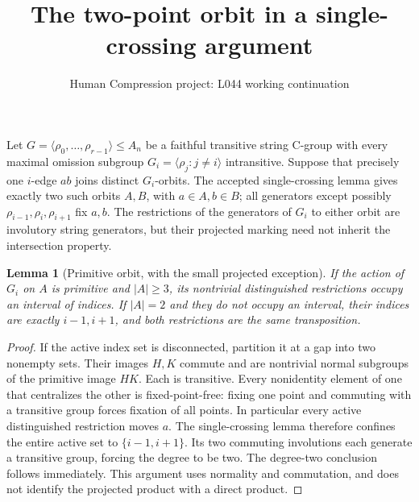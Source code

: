 \documentclass[11pt,a4paper]{article}
\title{The two-point orbit in a single-crossing argument}
\author{Human Compression project: L044 working continuation}
\date{}
\newtheorem{lemma}{Lemma}
\newcommand{\gen}[1]{\langle#1\rangle}
\begin{document}
\maketitle
Let $G=\gen{\rho_0,\ldots,\rho_{r-1}}\leq A_n$ be a faithful
transitive string C-group with every maximal omission subgroup
$G_i=\gen{\rho_j:j\ne i}$ intransitive. Suppose that precisely one
$i$-edge $ab$ joins distinct $G_i$-orbits. The accepted single-crossing
lemma gives exactly two such orbits $A,B$, with $a\in A,b\in B$;
all generators except possibly $\rho_{i-1},\rho_i,\rho_{i+1}$ fix
$a,b$. The restrictions of the generators of $G_i$ to either orbit
are involutory string generators, but their projected marking need
not inherit the intersection property.

\begin{lemma}[Primitive orbit, with the small projected exception]
If the action of $G_i$ on $A$ is primitive and $|A|\geq3$, its
nontrivial distinguished restrictions occupy an interval of indices.
If $|A|=2$ and they do not occupy an interval, their indices are
exactly $i-1,i+1$, and both restrictions are the same transposition.
\end{lemma}
\begin{proof}
If the active index set is disconnected, partition it at a gap into
two nonempty sets. Their images $H,K$ commute and are nontrivial
normal subgroups of the primitive image $HK$. Each is transitive.
Every nonidentity element of one that centralizes the other is
fixed-point-free: fixing one point and commuting with a transitive
group forces fixation of all points. In particular every active
distinguished restriction moves $a$. The single-crossing lemma
therefore confines the entire active set to $\{i-1,i+1\}$. Its two
commuting involutions each generate a transitive group, forcing the
degree to be two. The degree-two conclusion follows immediately.
This argument uses normality and commutation, and does not identify
the projected product with a direct product.
\end{proof}
\end{document}
